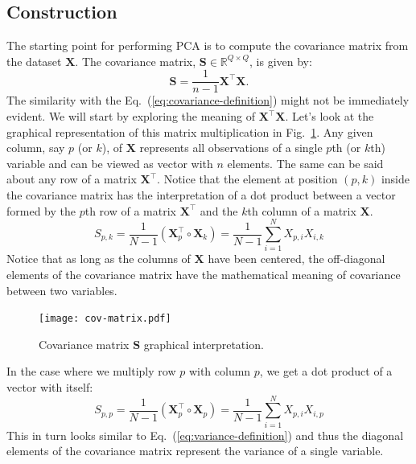 \documentclass[10pt,twocolumn]{article}
\begin{document}
\subsection{Construction}

The starting point for performing PCA is to compute the covariance matrix from the dataset $\mathbf{X}$. The covariance matrix, $\mathbf{S} \in \mathbb{R}^{Q \times Q}$, is given by:
\begin{equation}\label{eq:cov-matrix}
\mathbf{S} = \frac{1}{n-1} \mathbf{X}^{\top} \mathbf{X}.
\end{equation}
The similarity with the Eq.~(\ref{eq:covariance-definition}) might not be immediately evident. We will start by exploring the meaning of $\mathbf{X}^{\top} \mathbf{X}$. Let's look at the graphical representation of this matrix multiplication in Fig.~\ref{fig:covariance-matrix}. Any given column, say $p$ (or $k$), of $\mathbf{X}$ represents all observations of a single $p$th (or $k$th) variable and can be viewed as vector with $n$ elements. The same can be said about any row of a matrix $\mathbf{X}^{\top}$. Notice that the element at position $(p,k)$ inside the covariance matrix has the interpretation of a dot product between a vector formed by the $p$th row of a matrix $\mathbf{X}^{\top}$ and the $k$th column of a matrix $\mathbf{X}$.
\begin{equation}
S_{p,k} = \frac{1}{N-1} (\mathbf{X}_p^{\top} \circ \mathbf{X}_k) = \frac{1}{N-1} \sum_{i=1}^N X_{p, i} X_{i, k}
\end{equation}
Notice that as long as the columns of $\mathbf{X}$ have been centered, the off-diagonal elements of the covariance matrix have the mathematical meaning of covariance between two variables.
\begin{figure}[t]
\centering\texttt{[image: cov-matrix.pdf]}
\caption{Covariance matrix $\mathbf{S}$ graphical interpretation.}
\label{fig:covariance-matrix}
\end{figure}
In the case where we multiply row $p$ with column $p$, we get a dot product of a vector with itself:
\begin{equation}
S_{p,p} = \frac{1}{N-1} ( \mathbf{X}_p^{\top} \circ \mathbf{X}_p) = \frac{1}{N-1} \sum_{i=1}^N X_{p, i} X_{i, p}
\end{equation}
This in turn looks similar to Eq.~(\ref{eq:variance-definition}) and thus the diagonal elements of the covariance matrix represent the variance of a single variable.
\end{document}
